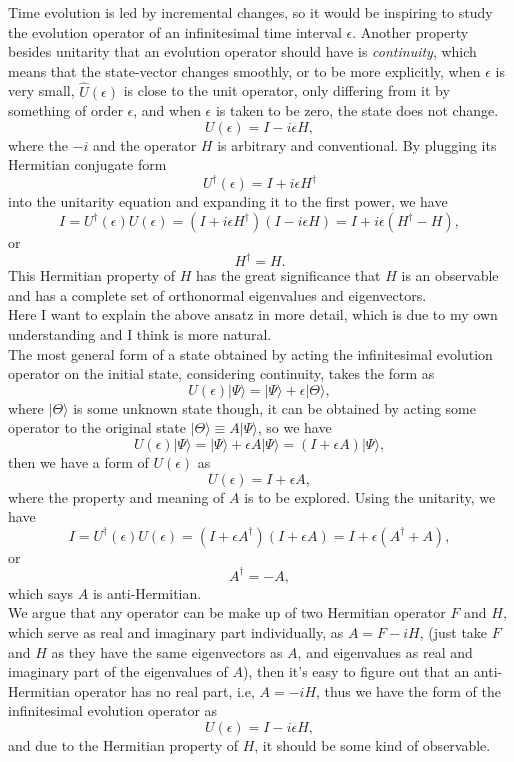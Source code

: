 \documentclass{article}
\newcommand{\be}{\begin{equation}}
\newcommand{\ee}{\end{equation}}
\newcommand{\1}{\left}
\newcommand{\2}{\right}
\newcommand{\ke}{\rangle}
\newcommand{\ep}{\epsilon}
\begin{document}
Time evolution is led by incremental changes, so it would be inspiring to study the evolution operator of an infinitesimal time interval $\epsilon$. Another property besides unitarity that an evolution operator should have is \textit{continuity}, which means that the state-vector changes smoothly, or to be more explicitly, when $\epsilon$ is very small, $\hat U(\epsilon)$ is close to the unit operator, only differing from it by something of order $\epsilon$, and when $\ep$ is taken to be zero, the state does not change. 
\be
U(\epsilon)=I-i\epsilon H,
\ee
where the $-i$ and the operator $H$ is arbitrary and conventional. By plugging its Hermitian conjugate form
\be
U^\dagger(\epsilon)=I+i\epsilon H^\dagger
\ee
into the unitarity equation and expanding it to the first power, we have
\be
I=U^\dagger(\epsilon)U(\epsilon)=(I+i\epsilon H^\dagger)(I-i\epsilon H)=I+i\epsilon (H^\dagger-H),
\ee
or
\be
H^\dagger=H.
\ee
This Hermitian property of  $H$ has the great significance that $H$ is an observable and has a complete set of orthonormal eigenvalues and eigenvectors.\\

{\color{blue}Here I want to explain the above ansatz in more detail, which is due to my own understanding and I think is more natural.\\
The most general form of a state obtained by acting the infinitesimal evolution operator on the initial state, considering continuity, takes the form as
\be
U(\ep)|\Psi\ke=|\Psi\ke+\ep|\Theta\ke,
\ee
where $|\Theta\ke$ is some unknown state though, it can be obtained by acting some operator to the original state $|\Theta\ke\equiv A|\Psi\ke$, so we have
\be
U(\ep)|\Psi\ke=|\Psi\ke+\ep A|\Psi\ke =(I+\ep A)|\Psi\ke,
\ee
then we have a form of $U(\ep)$ as
\be
U(\epsilon)=I+\ep A,
\ee
where the property and meaning of $A$ is to be explored. Using the unitarity, we have
\be
I=U^\dagger(\epsilon)U(\epsilon)=(I+\ep A^\dagger)(I+\ep A)=I+\epsilon (A^\dagger+A),
\ee
or
\be
A^\dagger=-A,
\ee
which says $A$ is anti-Hermitian.\\
We argue that any operator can be make up of two Hermitian operator $F$ and $H$, which serve as real and imaginary part individually, as $A=F-iH$, (just take $F$ and $H$ as they have the same eigenvectors as $A$, and eigenvalues as real and imaginary part of the eigenvalues of $A$), then it's easy to figure out that an anti-Hermitian operator has no real part, i.e, $A=-iH$, thus we have the form of the infinitesimal evolution operator as
\be
U(\epsilon)=I-i\epsilon H,
\ee
and due to the Hermitian property of $H$, it should be some kind of observable.\\}
\end{document}
